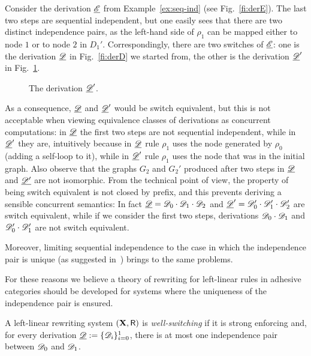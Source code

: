 \begin{example}
	Consider the derivation $\underline{\mathscr{E}}$ from Example~\ref{ex:seq-ind} (see Fig.~\ref{fi:derE}).
	The last two steps are sequential independent, but one easily sees
	that there are two distinct independence pairs, as the left-hand side
	of $\rho_1$ can be mapped either to node $1$ or to node
	$2$ in $D_1'$. Correspondingly, there
	are two switches of $\underline{\mathscr{E}}$: one is the derivation $\underline{\mathscr{D}}$ in
	Fig.~\ref{fi:derD} we started from, the other is the derivation
	$\underline{\mathscr{D}}'$ in Fig.~\ref{fi:derD1}.
	
	\begin{figure}
%		
		\caption{The derivation $\underline{\mathscr{D}}'$.}
		\label{fi:derD1}
	\end{figure}
	
	As a consequence, $\underline{\mathscr{D}}$ and $\underline{\mathscr{D}}'$ would be switch
	equivalent, but this is not acceptable when viewing equivalence
	classes of derivations as concurrent computations: in $\underline{\mathscr{D}}$ the
	first two steps are not sequential independent, while in $\underline{\mathscr{D}}'$
	they are, intuitively because in $\underline{\mathscr{D}}$ rule $\rho_1$ uses the
	node generated by $\rho_0$ (adding a self-loop to it), while in
	$\underline{\mathscr{D}}'$ rule $\rho_1$ uses the node that was in the initial
	graph. Also observe that the graphs $G_2$ and $G_2'$ produced after
	two steps in $\underline{\mathscr{D}}$ and $\underline{\mathscr{D'}}$ are not isomorphic. From the
	technical point of view, the property of being switch equivalent is
	not closed by prefix, and this prevents deriving a sensible
	concurrent semantics: In fact
	$\underline{\mathscr{D}} = \mathscr{D}_0\cdot \mathscr{D}_1 \cdot \mathscr{D}_2$ and
	$\underline{\mathscr{D}}' = \mathscr{D}_0'\cdot \mathscr{D}_1' \cdot \mathscr{D}_2'$ are
	switch equivalent, while if we consider the first two steps,
	derivations $\mathscr{D}_0 \cdot \mathscr{D}_1$ and
	$\mathscr{D}_0' \cdot \mathscr{D}_1'$ are not switch equivalent.
\end{example} 

Moreover, limiting sequential independence to the case in which the independence
	pair is unique (as suggested in~\cite{baldan2017domains}) brings to the same problems.

For these reasons we believe a theory of rewriting for
left-linear rules in adhesive categories should be developed for
systems where the uniqueness of the independence pair is ensured.

\begin{definition}
	A left-linear rewriting system $(\textbf {\textup{X}}, \mathsf{R})$ is \emph{well-switching} if it is strong enforcing and, for every derivation $\underline{\mathscr{D}}:=\{\mathscr{D}_{i}\}_{i=0}^1$, there is at most one independence pair between $\mathscr{D}_0$ and $\mathscr{D}_1$.
\end{definition}


